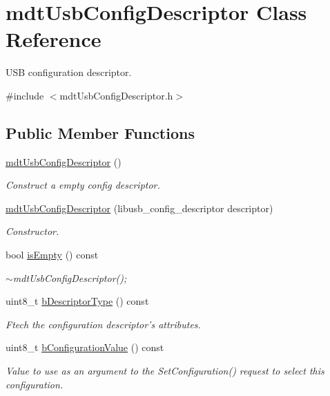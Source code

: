 \hypertarget{classmdt_usb_config_descriptor}{\section{mdt\-Usb\-Config\-Descriptor Class Reference}
\label{classmdt_usb_config_descriptor}
}


U\-S\-B configuration descriptor.  




{\ttfamily \#include $<$mdt\-Usb\-Config\-Descriptor.\-h$>$}

\subsection*{Public Member Functions}
\begin{DoxyCompactItemize}
\item 
\hyperlink{classmdt_usb_config_descriptor_a27d865718f38302de291d85d1ed667c1}{mdt\-Usb\-Config\-Descriptor} ()
\begin{DoxyCompactList}\small\item\em Construct a empty config descriptor. \end{DoxyCompactList}\item 
\hyperlink{classmdt_usb_config_descriptor_a6f94665d778df685dcb6db211ba4cc25}{mdt\-Usb\-Config\-Descriptor} (libusb\-\_\-config\-\_\-descriptor descriptor)
\begin{DoxyCompactList}\small\item\em Constructor. \end{DoxyCompactList}\item 
bool \hyperlink{classmdt_usb_config_descriptor_ae9d2e57e77a01cd9c3ad7b81f9c62d61}{is\-Empty} () const 
\begin{DoxyCompactList}\small\item\em $\sim$mdt\-Usb\-Config\-Descriptor(); \end{DoxyCompactList}\item 
uint8\-\_\-t \hyperlink{classmdt_usb_config_descriptor_a86dda8c4b76e5761e859325b7e1bcd65}{b\-Descriptor\-Type} () const 
\begin{DoxyCompactList}\small\item\em Ftech the configuration descriptor's attributes. \end{DoxyCompactList}\item 
uint8\-\_\-t \hyperlink{classmdt_usb_config_descriptor_abc3cfd4abf309a10a458fbdd1c2bcea2}{b\-Configuration\-Value} () const 
\begin{DoxyCompactList}\small\item\em Value to use as an argument to the Set\-Configuration() request to select this configuration. \end{DoxyCompactList}\item 

\end{DoxyCompactItemize}
